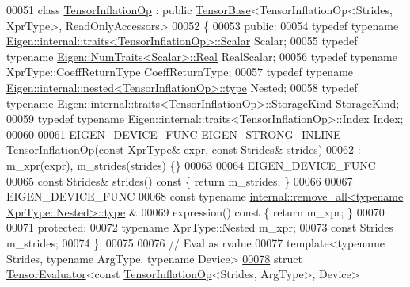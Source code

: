 \begin{DoxyCode}
00051 \textcolor{keyword}{class }\hyperlink{class_eigen_1_1_tensor_inflation_op}{TensorInflationOp} : \textcolor{keyword}{public} \hyperlink{class_eigen_1_1_tensor_base}{TensorBase}<TensorInflationOp<Strides, XprType>,
       ReadOnlyAccessors>
00052 \{
00053   \textcolor{keyword}{public}:
00054   \textcolor{keyword}{typedef} \textcolor{keyword}{typename} \hyperlink{struct_eigen_1_1internal_1_1traits}{Eigen::internal::traits<TensorInflationOp>::Scalar}
       Scalar;
00055   \textcolor{keyword}{typedef} \textcolor{keyword}{typename} \hyperlink{group___sparse_core___module}{Eigen::NumTraits<Scalar>::Real} RealScalar;
00056   \textcolor{keyword}{typedef} \textcolor{keyword}{typename} XprType::CoeffReturnType CoeffReturnType;
00057   \textcolor{keyword}{typedef} \textcolor{keyword}{typename} \hyperlink{class_eigen_1_1internal_1_1_tensor_lazy_evaluator_writable}{Eigen::internal::nested<TensorInflationOp>::type}
       Nested;
00058   \textcolor{keyword}{typedef} \textcolor{keyword}{typename} \hyperlink{struct_eigen_1_1internal_1_1traits}{Eigen::internal::traits<TensorInflationOp>::StorageKind}
       StorageKind;
00059   \textcolor{keyword}{typedef} \textcolor{keyword}{typename} \hyperlink{struct_eigen_1_1internal_1_1traits}{Eigen::internal::traits<TensorInflationOp>::Index}
       \hyperlink{namespace_eigen_a62e77e0933482dafde8fe197d9a2cfde}{Index};
00060 
00061   EIGEN\_DEVICE\_FUNC EIGEN\_STRONG\_INLINE \hyperlink{class_eigen_1_1_tensor_inflation_op}{TensorInflationOp}(\textcolor{keyword}{const} XprType& expr, \textcolor{keyword}{const} 
      Strides& strides)
00062       : m\_xpr(expr), m\_strides(strides) \{\}
00063 
00064     EIGEN\_DEVICE\_FUNC
00065     \textcolor{keyword}{const} Strides& strides()\textcolor{keyword}{ const }\{ \textcolor{keywordflow}{return} m\_strides; \}
00066 
00067     EIGEN\_DEVICE\_FUNC
00068     \textcolor{keyword}{const} \textcolor{keyword}{typename} \hyperlink{group___sparse_core___module}{internal::remove\_all<typename XprType::Nested>::type}
      &
00069     expression()\textcolor{keyword}{ const }\{ \textcolor{keywordflow}{return} m\_xpr; \}
00070 
00071   \textcolor{keyword}{protected}:
00072     \textcolor{keyword}{typename} XprType::Nested m\_xpr;
00073     \textcolor{keyword}{const} Strides m\_strides;
00074 \};
00075 
00076 \textcolor{comment}{// Eval as rvalue}
00077 \textcolor{keyword}{template}<\textcolor{keyword}{typename} Str\textcolor{keywordtype}{id}es, \textcolor{keyword}{typename} ArgType, \textcolor{keyword}{typename} Device>
\hyperlink{struct_eigen_1_1_tensor_evaluator_3_01const_01_tensor_inflation_op_3_01_strides_00_01_arg_type_01_4_00_01_device_01_4}{00078} \textcolor{keyword}{struct }\hyperlink{struct_eigen_1_1_tensor_evaluator}{TensorEvaluator}<const \hyperlink{class_eigen_1_1_tensor_inflation_op}{TensorInflationOp}<Strides, ArgType>, Device>

\end{DoxyCode}
